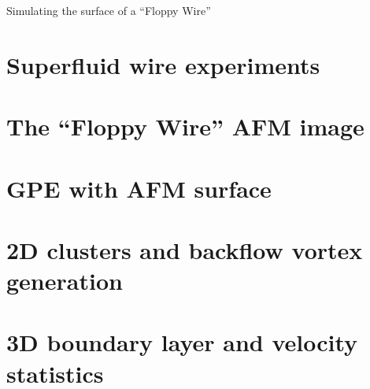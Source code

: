 \begin{chapter}{\label{cha:afm}Simulating the surface of a ``Floppy Wire''}
\section{\label{section:sfwire} Superfluid wire experiments}
\section{\label{section:afmimage} The ``Floppy Wire'' AFM image}
\section{\label{section:gpeafm} GPE with AFM surface}
\section{\label{section:2dafm} 2D clusters and backflow vortex generation}
\section{\label{section:3dafmlayer} 3D boundary layer and velocity statistics}
\end{chapter}
